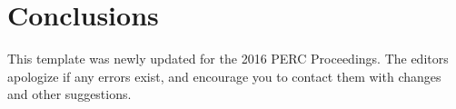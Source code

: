 \documentclass[english,aps,pra,reprint,noshowpacs,superscriptaddress]{revtex4-1}
\begin{document}
\section{Conclusions}
This template was newly updated for the 2016 PERC Proceedings.  The
editors apologize if any errors exist, and encourage you to contact
them with changes and other suggestions.  \cite{manogue2001paradigms}








\end{document}
